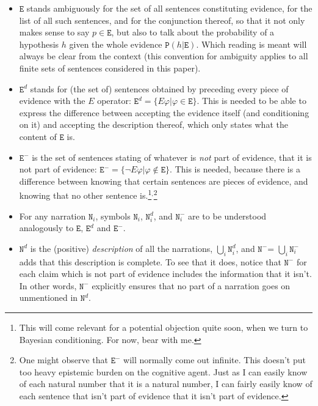 \documentclass[10pt,leqno]{article}
\newcommand{\n}{\neg}
\newcommand{\pr}[1]{\mbox{$\mathtt{P}(#1)$}}
\begin{document}
\begin{itemize}
\item $\mathtt{E}$ stands ambiguously for the set of all sentences constituting evidence,  for the list of all such sentences, and for the conjunction thereof, so that it not only makes sense to say $p \in \mathtt{E}$, but also to talk about the probability of a hypothesis $h$ given the whole evidence $\pr{h\vert \mathtt{E}}$. Which reading is meant will always be clear from the context (this convention for ambiguity applies to all finite sets of sentences considered in this paper).
\item $\mathtt{E}^d$ stands for (the set of) sentences obtained by preceding every piece of evidence with the $E$ operator: $\mathtt{E}^d=\{E\varphi \vert \varphi \in \mathtt{E}\}$. This is needed to be able to express the difference between accepting the evidence itself (and conditioning on it) and accepting the description thereof, which only states what the content of $\mathtt{E}$ is.
\item $\mathtt{E}^-$ is the set  of sentences stating of whatever is \emph{not} part of evidence, that it is not part of evidence: $\mathtt{E}^-=\{\n E\varphi \vert \varphi \not \in \mathtt{E}\}$. This is needed, because there is a difference between knowing that certain  sentences are pieces of evidence, and knowing that no  other sentence is.\footnote{This will come relevant for a potential objection quite soon, when we turn to Bayesian conditioning. For now, bear with me.}$^,$\footnote{One might observe that $\mathtt{E}^-$ will normally come out infinite. This doesn't put too heavy epistemic burden on the cognitive agent. Just as I can easily know of each natural number that it is a natural number, I can fairly easily know of each sentence that isn't part of evidence that it isn't part of evidence.}
\item For any narration $\mathtt{N}_i$,  symbols $\mathtt{N}_i$, $\mathtt{N}_i^d$, and $\mathtt{N}_i^-$  are to be understood analogously to $\mathtt{E}$, $\mathtt{E}^d$ and $\mathtt{E}^-$. 
\item  $\mathtt{N}^d$ is the (positive) \emph{description} of all the narrations, $\bigcup_i\mathtt{N}_i^d$,  and $\mathtt{N}^-$= $\bigcup_i  \mathtt{N}^-_i$ adds that this description is complete. To see that it does, notice that $\mathtt{N}^-$ for each claim which is not part of evidence includes the information that it isn't. In other words, $\mathtt{N}^-$ explicitly ensures that no part of a narration goes on unmentioned in $\mathtt{N}^d$.


\end{itemize}
\end{document}
